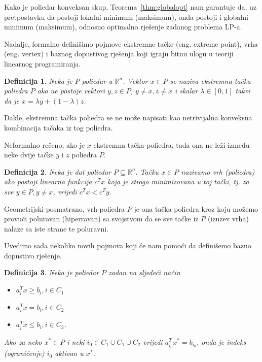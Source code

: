 \documentclass[b5paper, utf8, 11pt, colorlinks]{book}
\newtheorem{definition}{Definicija}[chapter]
\theoremstyle{definition}
\begin{document}
 Kako je poliedar konveksan skup, Teorema~\ref{thm:globalopt} nam garantuje da, uz pretpostavku da postoji lokalni minimum (maksimum), onda postoji  i globalni minimum (maksimum), odnosno optimalno rješenje zadanog problema LP-a. 
 
  Nadalje, formalno definišimo pojmove ekstremne tačke (eng. extreme point), vrha (eng. vertex) i baznog dopustivog rješenja koji igraju bitnu ulogu u teoriji linearnog programiranja. 


\begin{definition}
   Neka je $P$ poliedar u $\mathbb{R}^n$.  Vektor $x \in P$ se naziva ekstremna tačka poliedra $P$
   ako ne postoje vektori $y, z \in P$, $y \neq x, z \neq x$ i skalar $\lambda \in [0, 1]$ takvi da je  $x = \lambda y + (1-\lambda)z$.
\end{definition}

Dakle, ekstremna tačka poliedra se ne može napisati kao netrivijalna konveksna kombinacija tačaka iz tog poliedra. 
 
  Neformalno rečeno, ako je  $x$ ekstremna tačka poliedra, tada ona ne leži između neke dvije tačke $y$ i $z$   poliedra $P$.
 
 
\begin{definition}\label{def:vrhPoliedra}
   Neka je dat poliedar $P \subseteq \mathbb{R}^n$. Tačku $x \in P$ nazivamo vrh (poliedra) ako postoji linearna funkcija  $c^T x$ koja je strogo minimizovana u toj tački, tj. za sve  $y\in P, y \neq x$, vrijedi $c^T x < c^T y$. 
\end{definition}
Geometrijski posmatrano,  vrh poliedra $P$ je ona tačka poliedra  kroz koju možemo provući poluravan (hiperravan) sa svojstvom da se sve tačke iz $P$ (izuzev vrha) nalaze sa iste strane te poluravni.

Uvedimo sada nekoliko novih pojmova koji će nam pomoći da definišemo bazno dopustivo rješenje.

\begin{definition}\label{dfn:lp_aktivan}
   Neka je poliedar $P$ zadan na sljedeći način
   \begin{itemize}
       \item $a_i^T x \geq b_i, i \in C_1$
       \item $a_i^T x = b_i, i \in C_2 $
       \item $a_i^T x \leq b_i, i \in C_3 $. 
   \end{itemize}
   Ako za neko $x^* \in P$ i neki $i_0 \in C_1 \cup C_1 \cup C_2$ vrijedi 
   $a_{i_0}^T x^* = b_{i_0}$, onda je indeks (ograničenje) $i_0$ aktivan u $x^*$. 
\end{definition}
\end{document}
